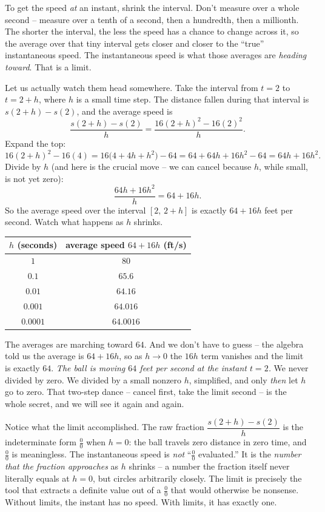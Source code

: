 \begin{intuitionbox}
To get the speed \emph{at} an instant, shrink the interval. Don't measure over a
whole second -- measure over a tenth of a second, then a hundredth, then a
millionth. The shorter the interval, the less the speed has a chance to change
across it, so the average over that tiny interval gets closer and closer to the
``true'' instantaneous speed. The instantaneous speed is what those averages are
\emph{heading toward}. That is a limit.
\end{intuitionbox}

Let us actually watch them head somewhere. Take the interval from $t = 2$ to
$t = 2 + h$, where $h$ is a small time step. The distance fallen during that
interval is $s(2 + h) - s(2)$, and the average speed is
\[
  \frac{s(2 + h) - s(2)}{h}
  = \frac{16(2 + h)^2 - 16(2)^2}{h}.
\]
Expand the top:
\[
  16(2 + h)^2 - 16(4)
  = 16\bigl(4 + 4h + h^2\bigr) - 64
  = 64 + 64h + 16h^2 - 64
  = 64h + 16h^2.
\]
Divide by $h$ (and here is the crucial move -- we can cancel because $h$, while
small, is not yet zero):
\[
  \frac{64h + 16h^2}{h} = 64 + 16h.
\]
So the average speed over the interval $[2,\, 2+h]$ is exactly $64 + 16h$ feet
per second. Watch what happens as $h$ shrinks.

\begin{center}
\begin{tabular}{cc}
\toprule
$h$ (seconds) & average speed $64 + 16h$ (ft/s) \\
\midrule
$1$        & $80$ \\
$0.1$      & $65.6$ \\
$0.01$     & $64.16$ \\
$0.001$    & $64.016$ \\
$0.0001$   & $64.0016$ \\
\bottomrule
\end{tabular}
\end{center}

The averages are marching toward $64$. And we don't have to guess -- the algebra
told us the average is $64 + 16h$, so as $h \to 0$ the $16h$ term vanishes and
the limit is exactly $64$. \emph{The ball is moving $64$ feet per second at the
instant $t = 2$.} We never divided by zero. We divided by a small nonzero $h$,
simplified, and only \emph{then} let $h$ go to zero. That two-step dance -- cancel
first, take the limit second -- is the whole secret, and we will see it again and
again.

\begin{happeningbox}
Notice what the limit accomplished. The raw fraction
$\dfrac{s(2+h) - s(2)}{h}$ is the indeterminate form $\frac{0}{0}$ when $h = 0$:
the ball travels zero distance in zero time, and $\frac{0}{0}$ is meaningless. The
instantaneous speed is \emph{not} ``$\frac{0}{0}$ evaluated.'' It is the
\emph{number that the fraction approaches} as $h$ shrinks -- a number the fraction
itself never literally equals at $h=0$, but circles arbitrarily closely. The limit
is precisely the tool that extracts a definite value out of a $\frac{0}{0}$ that
would otherwise be nonsense. Without limits, the instant has no speed. With limits,
it has exactly one.
\end{happeningbox}

